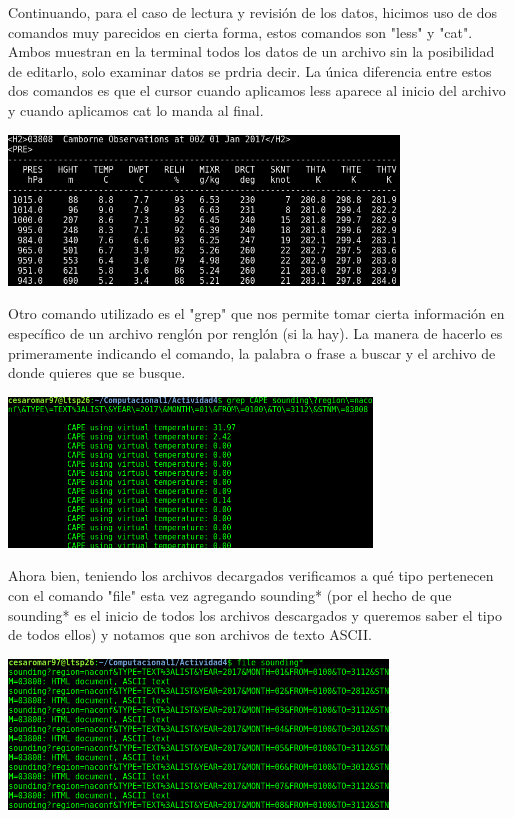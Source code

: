 \documentclass[12pt]{article}
\begin{document}
Continuando, para el caso de lectura y revisión de los datos, hicimos uso de dos comandos muy parecidos en cierta forma, estos comandos son "less" y "cat". Ambos muestran en la terminal todos los datos de un archivo sin la posibilidad de editarlo, solo examinar datos se prdria decir. La única diferencia entre estos dos comandos es que el cursor cuando aplicamos less aparece al inicio del archivo y cuando aplicamos cat lo manda al final. 
\begin{center}
	\includegraphics[height=4cm]{datos.png}
\end{center}
Otro comando utilizado es el "grep" que nos permite tomar cierta información en específico de un archivo renglón por renglón (si la hay). La manera de hacerlo es primeramente indicando el comando, la palabra o frase a buscar y el archivo de donde quieres que se busque.
\begin{center}
	\includegraphics[height=4cm]{buscando.png}
\end{center}
Ahora bien, teniendo los archivos decargados verificamos a qué tipo pertenecen con el comando "file" esta vez agregando sounding* (por el hecho de que sounding* es el inicio de todos los archivos descargados y queremos saber el tipo de todos ellos) y notamos que son archivos de texto ASCII.
\begin{center}
	\includegraphics[height=4cm]{file.png}
\end{center}
\end{document}
